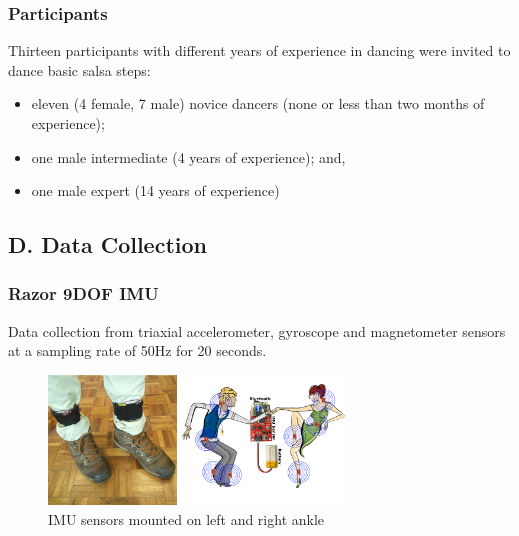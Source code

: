 \documentclass{beamer}
\begin{document}
\begin{frame}
\frametitle{Participants}
\vspace{-0.7cm}

Thirteen participants with different years of experience
in dancing were invited to dance basic salsa steps:

\begin{itemize}
    \item eleven (4 female, 7 male) novice dancers (none or less than two months of experience);
    \item one male intermediate (4 years of experience); and,
    \item one male expert (14 years of experience)
\end{itemize}



\end{frame}


\subsection{D. Data Collection}

\begin{frame}
\frametitle{Razor 9DOF IMU}
\vspace{-0.7cm}

Data collection from triaxial accelerometer, gyroscope and magnetometer sensors
at a sampling rate of 50Hz for 20 seconds.

\begin{figure}[!htb]
\centering
\includegraphics[width=0.7\textwidth]{datacollection01}
\caption[PA]{IMU sensors mounted on left and right ankle}

\label{fig:sn}
\end{figure}



\end{frame}
\end{document}
